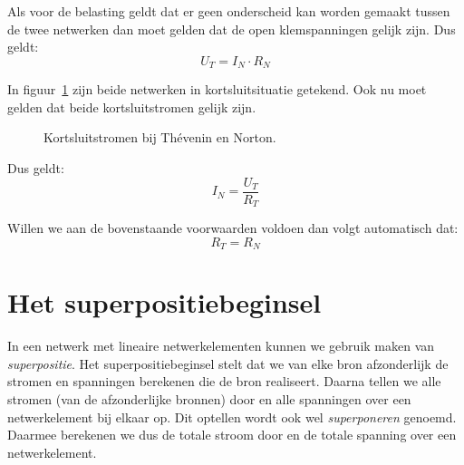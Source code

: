  Als voor de belasting geldt dat er geen
onderscheid kan worden gemaakt tussen de twee netwerken dan moet gelden dat de open klemspanningen
gelijk zijn. Dus geldt:
%
\begin{equation}
U_T = I_N\cdot R_N
\end{equation}

In figuur~\ref{fig:gelkortsluitstromenbijtheveninennorton} zijn beide netwerken in kortsluitsituatie
getekend. Ook nu moet gelden dat beide kortsluitstromen gelijk zijn.
\begin{figure}[!ht]
\centering
\begin{subfigure}[b]{0.48\textwidth}
\centering
{}
\end{subfigure}%
\begin{subfigure}[b]{0.48\textwidth}
\centering
{}
\end{subfigure}
\caption{Kortsluitstromen bij Th\'evenin en Norton.}
\label{fig:gelkortsluitstromenbijtheveninennorton}
\end{figure}

Dus geldt:
%
\begin{equation}
I_N = \dfrac{U_T}{R_T}
\end{equation}

Willen we aan de bovenstaande voorwaarden voldoen dan volgt automatisch dat:
%
\begin{equation}
R_T = R_N
\end{equation}


\section{Het superpositiebeginsel}
\label{sec:gelsuperpositie}
In een netwerk met lineaire netwerkelementen kunnen we gebruik maken van 
\textsl{superpositie}. Het superpositiebeginsel stelt dat we van elke bron
afzonderlijk de stromen en spanningen berekenen die de bron realiseert.
Daarna tellen we alle stromen (van de afzonderlijke bronnen) door en
alle spanningen over een netwerkelement bij elkaar op. Dit optellen wordt
ook wel \textsl{superponeren} genoemd. Daarmee berekenen we dus de
totale stroom door en de totale spanning over een netwerkelement.

